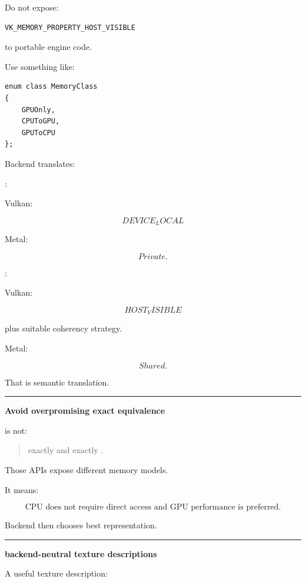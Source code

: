 Do not expose:

\begin{verbatim}
VK_MEMORY_PROPERTY_HOST_VISIBLE
\end{verbatim}

to portable engine code.

Use something like:

\begin{verbatim}
enum class MemoryClass
{
    GPUOnly,
    CPUToGPU,
    GPUToCPU
};
\end{verbatim}

Backend translates:

:

Vulkan:

\[
DEVICE_LOCAL
\]

Metal:

\[
Private.
\]

:

Vulkan:

\[
HOST_VISIBLE
\]

plus suitable coherency strategy.

Metal:

\[
Shared.
\]

That is semantic translation.

\begin{center}\rule{0.5\linewidth}{0.5pt}\end{center}

\textbf{Avoid overpromising exact equivalence}

 is not:

\begin{quote}
exactly  and exactly .
\end{quote}

Those APIs expose different memory models.

It means:

\[
\boxed{
\text{CPU does not require direct access and GPU performance is preferred}.
}
\]

Backend then chooses best representation.

\begin{center}\rule{0.5\linewidth}{0.5pt}\end{center}

\textbf{backend-neutral texture descriptions}

A useful texture description:

